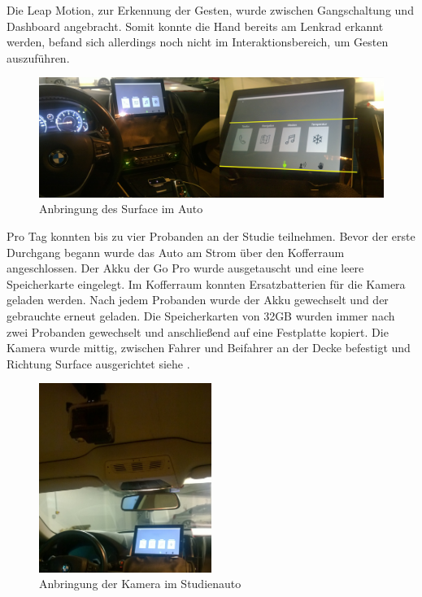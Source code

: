 Die Leap Motion, zur Erkennung der Gesten, wurde zwischen Gangschaltung und Dashboard angebracht. 
Somit konnte die Hand bereits am Lenkrad erkannt werden, befand sich allerdings noch nicht im Interaktionsbereich, um Gesten auszuführen. 
\begin{figure}[ht]
  \centering
  \includegraphics[width=1\textwidth]{img/AutoSetting2.jpg}
  \caption{Anbringung des Surface im Auto}
  \label{fig:AnbringungSurface}
\end{figure} 
Pro Tag konnten bis zu vier Probanden an der Studie teilnehmen. 
Bevor der erste Durchgang begann wurde das Auto am Strom über den Kofferraum angeschlossen. 
Der Akku der Go Pro wurde ausgetauscht und eine leere Speicherkarte eingelegt. 
Im Kofferraum konnten Ersatzbatterien für die Kamera geladen werden. 
Nach jedem Probanden wurde der Akku gewechselt und der gebrauchte erneut geladen. 
Die Speicherkarten von 32GB wurden immer nach zwei Probanden gewechselt und anschließend auf eine Festplatte kopiert. 
Die Kamera wurde mittig, zwischen Fahrer und Beifahrer an der Decke befestigt und Richtung Surface ausgerichtet siehe .
\begin{figure}[ht]
  \centering
  \includegraphics[width=0.5\textwidth]{img/Kamera3.jpg}
  \caption{Anbringung der Kamera im Studienauto}
  \label{fig:Kamera}
\end{figure} 

